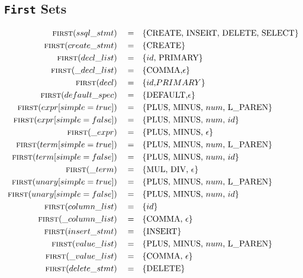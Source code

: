 \documentclass{article}
\begin{document}
\subsection{\texttt{First} Sets}
\begin{align*}
\textsc{first}(ssql\_stmt) \quad =& \quad\{\text{CREATE, INSERT, DELETE, SELECT}\} \\
\textsc{first}(create\_stmt) \quad =& \quad\{\text{CREATE}\} \\
\textsc{first}(decl\_list) \quad =& \quad\{id\text{, PRIMARY}\} \\
\textsc{first}(\_decl\_list) \quad =& \quad\{\text{COMMA,} \epsilon\} \\
\textsc{first}(decl) \quad =& \quad\{{id\text, PRIMARY}\} \\
\textsc{first}(default\_spec) \quad =& \quad\{\text{DEFAULT,} \epsilon\} \\
\textsc{first}(expr[simple=true]) \quad =& \quad\{\text{PLUS, MINUS, } num \text{, L\_PAREN}\} \\
\textsc{first}(expr[simple=false]) \quad =& \quad\{\text{PLUS, MINUS, }num\text{, }id\} \\
\textsc{first}(\_expr) \quad =& \quad\{\text{PLUS, MINUS, }\epsilon\} \\
\textsc{first}(term[simple=true]) \quad =& \quad\{\text{PLUS, MINUS, }num\text{, L\_PAREN}\} \\
\textsc{first}(term[simple=false]) \quad =& \quad\{\text{PLUS, MINUS, }num\text{, }id\} \\
\textsc{first}(\_term) \quad =& \quad\{\text{MUL, DIV, }\epsilon\} \\
\textsc{first}(unary[simple=true]) \quad =& \quad\{\text{PLUS, MINUS, } num \text{, L\_PAREN}\} \\
\textsc{first}(unary[simple=false]) \quad =& \quad\{\text{PLUS, MINUS, }num\text{, }id\} \\
\textsc{first}(column\_list) \quad =& \quad\{id\} \\
\textsc{first}(\_column\_list) \quad =& \quad\{\text{COMMA, }\epsilon\} \\
\textsc{first}(insert\_stmt) \quad =& \quad\{\text{INSERT}\} \\
\textsc{first}(value\_list) \quad =& \quad\{\text{PLUS, MINUS, } num \text{, L\_PAREN}\} \\
\textsc{first}(\_value\_list) \quad =& \quad\{\text{COMMA, }\epsilon\} \\
\textsc{first}(delete\_stmt) \quad =& \quad\{\text{DELETE}\} \\

\end{align*}
\end{document}
